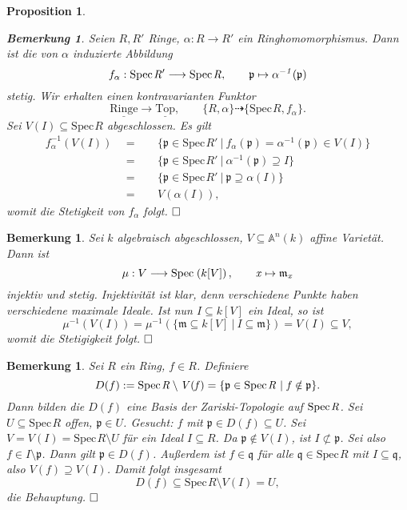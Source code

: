\documentclass[11pt]{book}
\newtheorem{proposition}[theorem]{Proposition}
\newtheorem{remark}[theorem]{Bemerkung}
\theoremstyle{nonumberbreak}
\newenvironment{pr}[1][]{\ifthenelse{\equal{#1}{}}{\proof}{\proof[#1]}\rm}{\endproof}
\newcommand{\spec}{\mathrm{Spec} \hspace{1pt} }
\newcommand{\p}{\mathfrak{p}}
\newcommand{\q}{\mathfrak{q}}
\newcommand{\K}{k}
\newcommand{\ideal}{\subseteq}
\newcommand{\ringe}{\underline{\mathrm{Ringe}}}
\newcommand{\topraum}{\underline{\mathrm{Top}}}
\begin{document}
\begin{spacing}{1.4}
\begin{proposition}
\begin{remark}
Seien $R,R'$ Ringe, $\alpha: R \longrightarrow R'$ ein Ringhomomorphismus. Dann ist die von $\alpha$ induzierte Abbildung
$$f_{\alpha}: \spec \it{R'} \longrightarrow \spec \it{R}, \qquad \p \mapsto \alpha ^{-1}(\p)$$
stetig. Wir erhalten einen kontravarianten Funktor
 $$ \ringe \longrightarrow \topraum, \qquad \{R, \alpha\} \dashrightarrow \{ \spec R, f_{\alpha} \}.$$
\begin{pr}
Sei $V(I) \subseteq \spec R$ abgeschlossen. Es gilt
\setlength{\abovedisplayskip}{5.5pt}
\setlength{\belowdisplayskip}{5.5pt}
\begin{alignat*}{5}
f_{\alpha}^{-1}\left(V(I)\right) \ \ &=&& \ \ \{ \p \in \spec R' \ \vert \ f_{\alpha}(\p) = \alpha^{-1}(\p) \in V(I) \} \\
&=&& \ \ \{ \p \in \spec R' \ \vert \ \alpha^{-1}(\p) \supseteq I \}\\
&=&& \ \ \{ \p \in \spec R' \ \vert \ \p \supseteq \alpha(I) \}\\
&=&& \ \ V\left( \alpha(I) \right),
\end{alignat*}
womit die Stetigkeit von $f_{\alpha}$ folgt. $\hfill \Box$
\end{pr}
\end{remark}
\end{proposition}

\begin{remark}  %
Sei $k$ algebraisch abgeschlossen, $V \subseteq \mathbb{A}^n(\K)$ affine Varietät. Dann ist 
$$\mu: V \longrightarrow \spec \left( \K[V]\right), \qquad \it{x} \mapsto \mathfrak{m}_{\it{x}}$$
injektiv und stetig.
\begin{pr}
Injektivität ist klar, denn verschiedene Punkte haben verschiedene maximale Ideale. Ist nun $I \ideal \K[V]$ ein Ideal, so ist
$$\mu^{-1}\left(V(I)\right) = \mu^{-1}\left( \{ \mathfrak{m} \ideal \K[V] \ \vert \ I \subseteq \mathfrak{m} \} \right) = V(I) \subseteq V,$$
womit die Stetigigkeit folgt. $\hfill \Box$
\end{pr}

\end{remark}

\begin{remark}   %
Sei $R$ ein Ring, $f\in R$. Definiere
$$D(f):= \spec \it{R} \setminus V(f) = \{ \p \in \spec \it{R} \ \vert \ f \notin \p \}.$$
Dann bilden die $D(f)$ eine Basis der Zariski-Topologie auf $\spec \it{R}$.
\begin{pr}
Sei $U \subseteq \spec R$ offen, $\p \in U$. Gesucht: $f$ mit $\p \in D(f) \subseteq U$. Sei $V=V(I)= \spec R \setminus U$ für ein Ideal $I \ideal R$. Da $\p \notin V(I)$, ist $I \nsubset \p$. Sei also $f \in I \setminus \p$. Dann gilt $\p \in D(f)$. Außerdem ist $f \in \q$ für alle $\q \in \spec R$ mit $I \subseteq \q$, also $V(f) \supseteq V(I)$. Damit folgt insgesamt 
$$D(f) \subseteq \spec R \setminus V(I) = U,$$
die Behauptung. $\hfill \Box$
\end{pr}
\end{remark}


\end{spacing}
\end{document}
